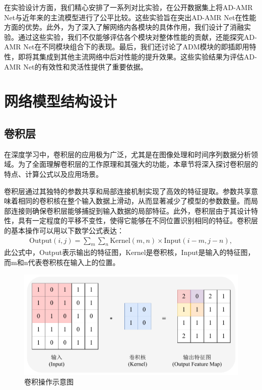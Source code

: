在实验设计方面，我们精心安排了一系列对比实验，在公开数据集上将AD-AMR Net与近年来的主流模型进行了公平比较。这些实验旨在突出AD-AMR Net在性能方面的优势。此外，为了深入了解网络内各模块的具体作用，我们设计了消融实验。通过这些实验，我们不仅能够评估各个模块对整体性能的贡献，还能探究AD-AMR Net在不同模块组合下的表现。最后，我们还讨论了ADM模块的即插即用特性，即将其集成到其他主流网络中后对性能的提升效果。这些实验结果为评估AD-AMR Net的有效性和灵活性提供了重要依据。



\section{网络模型结构设计}\label{sec:background}

\subsection{卷积层}\label{sec:background}

在深度学习中，卷积层的应用极为广泛，尤其是在图像处理和时间序列数据分析领域。为了全面理解卷积层的工作原理和其强大的功能，本章节将深入探讨卷积层的特点、计算公式以及应用场景。

卷积层通过其独特的参数共享和局部连接机制实现了高效的特征提取。参数共享意味着相同的卷积核在整个输入数据上滑动，从而显著减少了模型的参数数量。而局部连接则确保卷积层能够捕捉到输入数据的局部特征。此外，卷积层由于其设计特性，具有一定程度的平移不变性，使得它能够在不同位置识别相同的特征。卷积层的基本操作可以用以下数学公式表达：
\begin{align}
    \text{Output}(i, j) = \sum_{m}\sum_{n} \text{Kernel}(m, n) \times \text{Input}(i-m, j-n),
    \label{equ: conv}
\end{align}
此公式中，Output表示输出的特征图，Kernel是卷积核，Input是输入的特征图，而m和n代表卷积核在输入上的位置。

\begin{figure}
    \centering
    \includegraphics[width=\textwidth]{Image/conv.pdf}
    \caption{卷积操作示意图}
    \label{fig:conv}
\end{figure}

